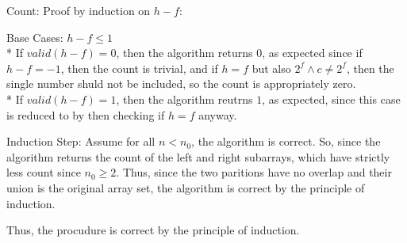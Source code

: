 \documentclass[letterpaper, reqno, 11pt]{article}
\begin{document}
\begin{description}
	\item{Count:}
	Proof by induction on $h-f$:
	\begin{description}
		\item{Base Cases:} $h-f\leq1$\\*
		If $valid(h-f)=0$, then the algorithm returns $0$, as expected
		since if $h-f=-1$, then the count is trivial, and if
		$h=f$ but also $2^f\land c\neq 2^f$, then the single number
		shuld not be included, so the count is appropriately zero.\\*
		If $valid(h-f)=1$, then the algorithm reutrns $1$, as expected,
		since this case is reduced to by then checking if $h=f$ anyway.
		\item{Induction Step:}
		Assume for all $n<n_0$, the algorithm is correct.
		So, since the algorithm returns the count of the left and right
		subarrays, which have strictly less count since $n_0\geq 2$.
		Thus, since the two paritions have no overlap and their union
		is the original array set, the algorithm is correct by the principle
		of induction.
	\end{description}
	Thus, the procudure is correct by the principle of induction.


\end{description}
\end{document}

